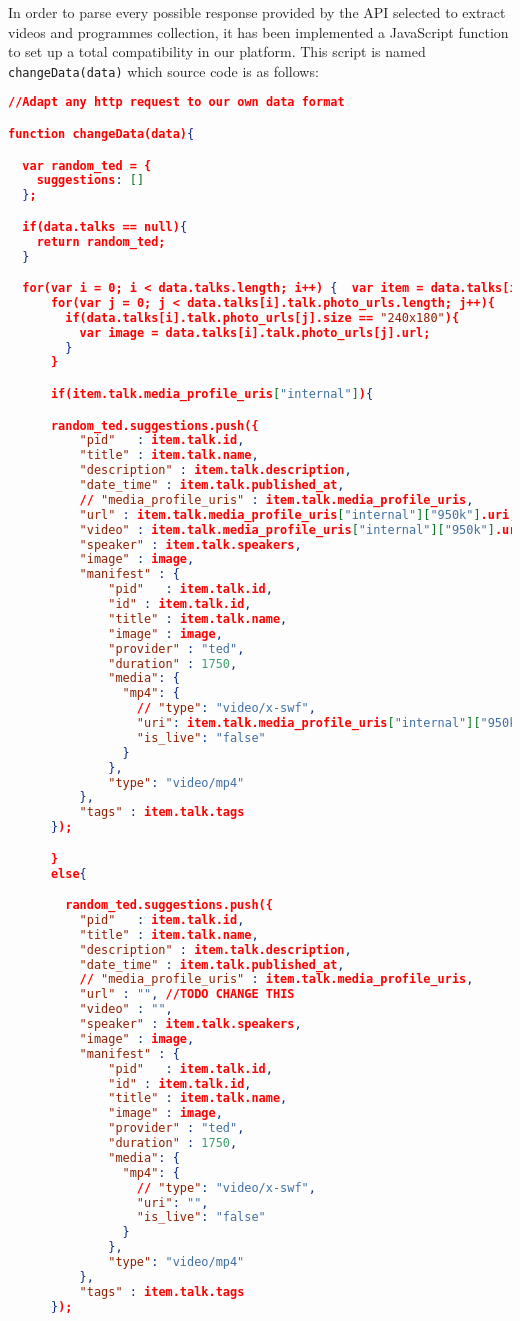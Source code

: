 \documentclass{acm_proc_article-sp}
\begin{document}
In order to parse every possible response provided by the API selected to extract videos and programmes collection, it has been implemented a JavaScript function to set up a total compatibility in our platform. This script is named \texttt{changeData(data)} which source code is as follows:

\begin{lstlisting}[language=json,firstnumber=1]
//Adapt any http request to our own data format

function changeData(data){

  var random_ted = {
    suggestions: []
  };

  if(data.talks == null){
    return random_ted;
  }  

  for(var i = 0; i < data.talks.length; i++) {  var item = data.talks[i];
      for(var j = 0; j < data.talks[i].talk.photo_urls.length; j++){
        if(data.talks[i].talk.photo_urls[j].size == "240x180"){
          var image = data.talks[i].talk.photo_urls[j].url;
        }
      } 

      if(item.talk.media_profile_uris["internal"]){

      random_ted.suggestions.push({ 
          "pid"   : item.talk.id,
          "title" : item.talk.name,          
          "description" : item.talk.description,
          "date_time" : item.talk.published_at,
          // "media_profile_uris" : item.talk.media_profile_uris,
          "url" : item.talk.media_profile_uris["internal"]["950k"].uri, //TODO CHANGE THIS
          "video" : item.talk.media_profile_uris["internal"]["950k"].uri,
          "speaker" : item.talk.speakers,
          "image" : image,
          "manifest" : {
              "pid"   : item.talk.id,
              "id" : item.talk.id,          
              "title" : item.talk.name,
              "image" : image,
              "provider" : "ted",
              "duration" : 1750,
              "media": {
                "mp4": {
                  // "type": "video/x-swf",
                  "uri": item.talk.media_profile_uris["internal"]["950k"].uri,
                  "is_live": "false"
                }
              },
              "type": "video/mp4"
          },
          "tags" : item.talk.tags
      });

      }
      else{

        random_ted.suggestions.push({ 
          "pid"   : item.talk.id,
          "title" : item.talk.name,          
          "description" : item.talk.description,
          "date_time" : item.talk.published_at,
          // "media_profile_uris" : item.talk.media_profile_uris,
          "url" : "", //TODO CHANGE THIS
          "video" : "",
          "speaker" : item.talk.speakers,
          "image" : image,
          "manifest" : {
              "pid"   : item.talk.id,
              "id" : item.talk.id,          
              "title" : item.talk.name,
              "image" : image,
              "provider" : "ted",
              "duration" : 1750,
              "media": {
                "mp4": {
                  // "type": "video/x-swf",
                  "uri": "",
                  "is_live": "false"
                }
              },
              "type": "video/mp4"
          },
          "tags" : item.talk.tags
      });


\end{lstlisting}
\end{document}
